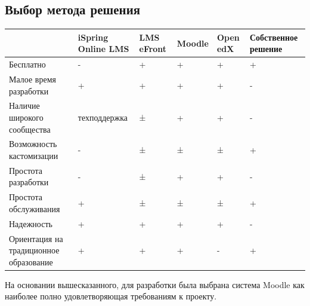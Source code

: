 \documentclass[a4paper,14pt]{article}
\begin{document}


\subsection{Выбор метода решения}

\begin{landscape}
	\begin{table}[!h]
		\begin{center}
			\begin{flushleft}
			\end{flushleft}
			
			\begin{tabular}{|l|l|l|l|l|l|}
				\hline
				& iSpring Online LMS & LMS eFront & Moodle & Open edX & Собственное решение \\ \hline
				Бесплатно                              & -                  & +          & +      & +        & +                   \\ \hline
				Малое время разработки                 & +                  & +          & +      & +        & -                   \\ \hline
				Наличие широкого сообщества            & техподдержка       & ±          & +      & +        & -                   \\ \hline
				Возможность кастомизации               & -                  & ±          & ±      & ±        & +                   \\ \hline
				Простота разработки                    & -                  & ±          & +      & +        & -                   \\ \hline
				Простота обслуживания                  & +                  & ±          & ±      & ±        & +                   \\ \hline
				Надежность                             & +                  & +          & +      & +        & -                   \\ \hline
				Ориентация на традиционное образование & +                  & +          & +      & -        & +                   \\ \hline
			\end{tabular}
		\end{center}
	\end{table}
\end{landscape}

На основании вышесказанного, для разработки была выбрана система Moodle как наиболее полно удовлетворяющая требованиям к проекту.
\end{document}
